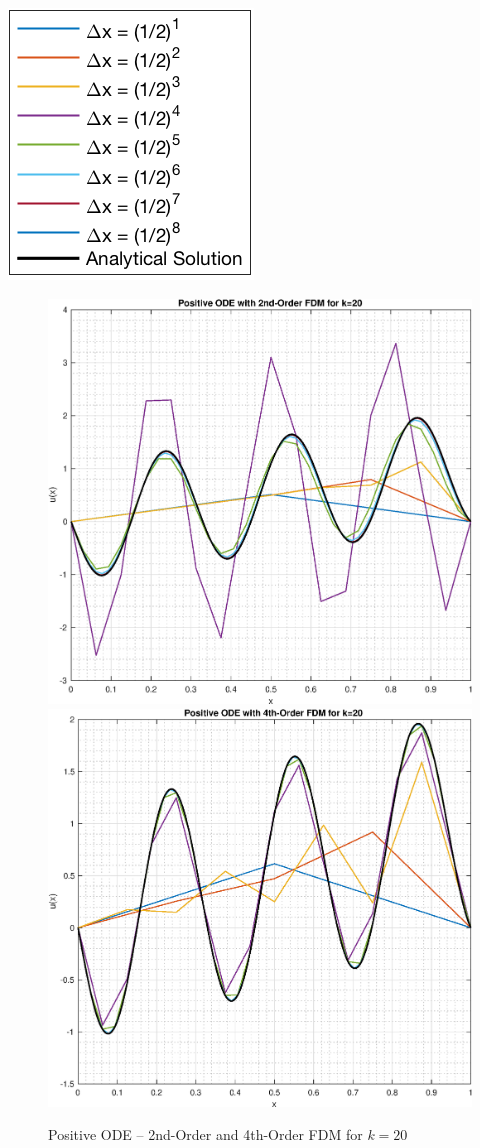 \documentclass[10pt, reqno]{article}		%
\numberwithin{equation}{section}
\begin{document}
\begin{center}
	\includegraphics[height = 0.25\linewidth]{legend}
\end{center}

\newpage

\begin{figure}[H]
\begin{center}
	\includegraphics[width = 0.49\linewidth]{positive_ode_order_2_k_20}
	\includegraphics[width = 0.49\linewidth]{positive_ode_order_4_k_20}
	\caption{Positive ODE -- 2nd-Order and 4th-Order FDM for $k = 20$}
\end{center}
\end{figure}
\end{document}
